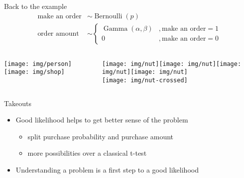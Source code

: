 \documentclass{beamer}
\begin{document}
\begin{frame}{Back to the example}
    \begin{align*}
        \text{make an order} &\sim \operatorname{Bernoulli}(p) \\
        \text{order amount} &\sim \begin{cases}
        \operatorname{Gamma}(\alpha, \beta)&, \text{make an order} = 1\\
        0&, \text{make an order} =0
        \end{cases}
    \end{align*}
\begin{columns}
\begin{column}{0.7\linewidth}
\texttt{[image: img/person]}
\texttt{[image: img/shop]}
\end{column}
\begin{column}{0.3\linewidth}
\texttt{[image: img/nut]}\texttt{[image: img/nut]}\texttt{[image: img/nut]}\texttt{[image: img/nut]}\\
\texttt{[image: img/nut-crossed]}
\end{column}
\end{columns}
\end{frame}
\begin{frame}{Takeouts}
    \begin{itemize}
        \item Good likelihood helps to get better sense of the problem
        \begin{itemize}
            \item split purchase probability and purchase amount
            \item more possibilities over a classical t-test
        \end{itemize}
        \item Understanding a problem is a first step to a good likelihood
    \end{itemize}
\end{frame}
\end{document}
